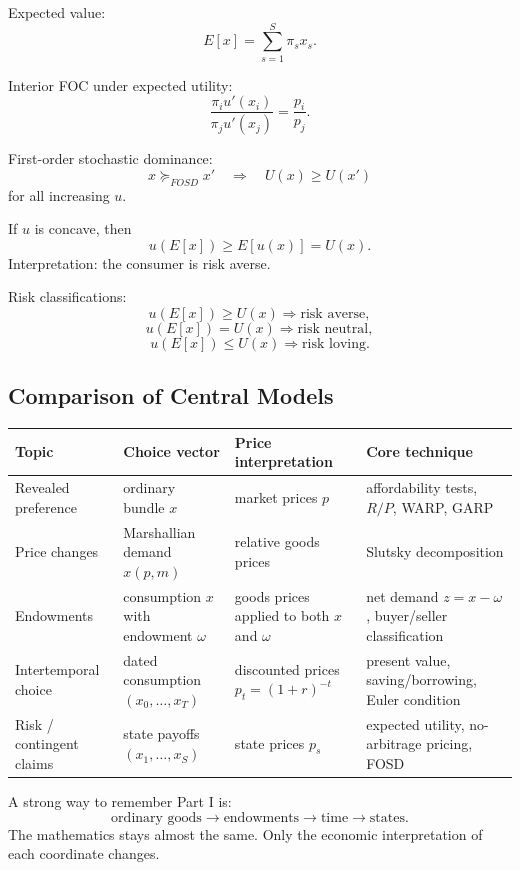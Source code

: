 \begin{keyformula}[title={Key Formula: expected value, FOSD, and risk attitudes}]
Expected value:
\[
E[x]=\sum_{s=1}^S \pi_s x_s.
\]

Interior FOC under expected utility:
\[
\frac{\pi_i u'(x_i)}{\pi_j u'(x_j)}=\frac{p_i}{p_j}.
\]

First-order stochastic dominance:
\[
x \succeq_{FOSD} x'
\quad \Longrightarrow \quad
U(x)\ge U(x')
\]
for all increasing $u$.

If $u$ is concave, then
\[
u(E[x]) \ge E[u(x)] = U(x).
\]
Interpretation: the consumer is risk averse.

Risk classifications:
\[
u(E[x]) \ge U(x) \Rightarrow \text{risk averse},
\]
\[
u(E[x]) = U(x) \Rightarrow \text{risk neutral},
\]
\[
u(E[x]) \le U(x) \Rightarrow \text{risk loving}.
\]
\end{keyformula}

\subsection{Comparison of Central Models}

\begin{center}
\renewcommand{\arraystretch}{1.25}
\begin{tabular}{|p{3.0cm}|p{3.4cm}|p{4.2cm}|p{4.0cm}|}
\hline
\textbf{Topic} & \textbf{Choice vector} & \textbf{Price interpretation} & \textbf{Core technique} \\
\hline
Revealed preference & ordinary bundle $x$ & market prices $p$ & affordability tests, $R/P$, WARP, GARP \\
\hline
Price changes & Marshallian demand $x(p,m)$ & relative goods prices & Slutsky decomposition \\
\hline
Endowments & consumption $x$ with endowment $\omega$ & goods prices applied to both $x$ and $\omega$ & net demand $z=x-\omega$, buyer/seller classification \\
\hline
Intertemporal choice & dated consumption $(x_0,\dots,x_T)$ & discounted prices $p_t=(1+r)^{-t}$ & present value, saving/borrowing, Euler condition \\
\hline
Risk / contingent claims & state payoffs $(x_1,\dots,x_S)$ & state prices $p_s$ & expected utility, no-arbitrage pricing, FOSD \\
\hline
\end{tabular}
\end{center}

\begin{examtip}
A strong way to remember Part I is:
\[
\text{ordinary goods} \rightarrow \text{endowments} \rightarrow \text{time} \rightarrow \text{states}.
\]
The mathematics stays almost the same. Only the economic interpretation of each coordinate changes.
\end{examtip}

